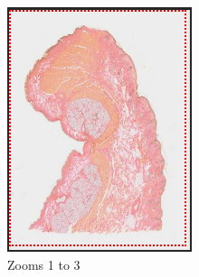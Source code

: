 \documentclass[a4paper,11pt]{report}
\numberwithin{figure}{chapter} %
\begin{document}
\begin{itemize}
         \begin{figure}[H]
            \centering
            \begin{subfigure}[b]{0.3\textwidth}
            \includegraphics[width=\textwidth]{images/zooms1.png}
            \caption{Zooms 1 to 3}
            \end{subfigure}
            \begin{subfigure}[b]{0.3\textwidth}

\end{subfigure}
\end{figure}
\end{itemize}
\end{document}
